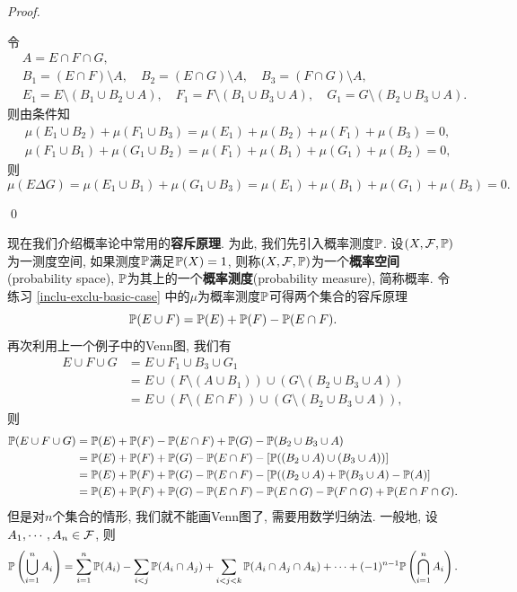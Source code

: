 \begin{proof}
\begin{enumerate}
    令
    \begin{align*}
        &A = E \cap F \cap G, \\
        &B_1 = (E \cap F) \setminus A, \quad B_2 = (E \cap G) \setminus A, \quad B_3 = (F \cap G) \setminus A, \\
        &E_1 = E \setminus (B_1 \cup B_2 \cup A), \quad
         F_1 = F \setminus (B_1 \cup B_3 \cup A), \quad
         G_1 = G \setminus (B_2 \cup B_3 \cup A).
    \end{align*}
    则由条件知
    \begin{align*}
        &\mu(E_1 \cup B_2) + \mu(F_1 \cup B_3) = \mu(E_1)+\mu(B_2)+\mu(F_1)+\mu(B_3)=0, \\
        &\mu(F_1 \cup B_1) + \mu(G_1 \cup B_2) = \mu(F_1)+\mu(B_1)+\mu(G_1)+\mu(B_2)=0,
    \end{align*}
    则
    $$\mu(E \Delta G)
    = \mu(E_1 \cup B_1)+\mu(G_1 \cup B_3) 
    = \mu(E_1) + \mu(B_1) + \mu(G_1) + \mu(B_3) = 0. $$
    \end{enumerate}
    \qed 
\end{proof}
\begin{example}
    现在我们介绍概率论中常用的\textbf{容斥原理}. 为此, 我们先引入概率测度$\P$. 设$(X, \calF, \P)$为一测度空间, 如果测度$\P$满足$\P(X) = 1$, 则称$(X,\calF,\P)$为一个\textbf{概率空间}(probability space), $\P$为其上的一个\textbf{概率测度}(probability measure), 简称概率. 令练习 \ref{inclu-exclu-basic-case} 中的$\mu$为概率测度$\P$可得两个集合的容斥原理
    $$\P(E \cup F) = \P(E)+\P(F) - \P(E \cap F). $$
    再次利用上一个例子中的Venn图, 我们有
    \begin{align*}
        E \cup F \cup G
        &= E \cup F_1 \cup B_3 \cup G_1 \\
        &= E \cup (F \setminus (A \cup B_1)) \cup (G \setminus (B_2 \cup B_3 \cup A)) \\
        &= E \cup (F \setminus (E \cap F)) \cup (G \setminus (B_2 \cup B_3 \cup A)), 
    \end{align*}
    则
    \begin{align*}
        \P(E \cup F \cup G)
        &= \P(E) + \P(F) - \P(E \cap F) + \P(G) - \P(B_2 \cup B_3 \cup A) \\
        &= \P(E)+\P(F)+\P(G) - \P(E \cap F) - [\P( (B_2 \cup A) \cup (B_3 \cup A) )] \\
        &= \P(E)+\P(F)+\P(G) - \P(E \cap F) - [\P( (B_2 \cup A) + \P(B_3 \cup A) - \P(A)] \\
        &= \P(E)+\P(F)+\P(G) - \P(E \cap F) - \P(E \cap G) - \P(F \cap G) + \P(E \cap F \cap G).
    \end{align*}
    但是对$n$个集合的情形, 我们就不能画Venn图了, 需要用数学归纳法. 一般地, 设$A_1, \cdots, A_n \in \calF$, 则
    \begin{equation}
    \P\br{\bCup{i=1}{n}A_i}
    = \Sum{i=1}{n}\P(A_i) - \sum_{i<j}\P(A_i \cap A_j) 
    + \sum_{i<j<k}\P(A_i \cap A_j \cap A_k) + \cdots + 
    (-1)^{n-1}\P\br{\bCap{i=1}{n}A_i}.
    \end{equation}
\end{example}
